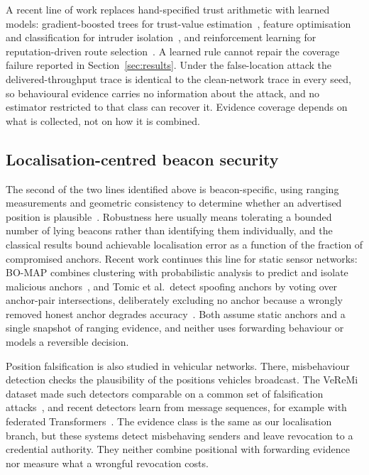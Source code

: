 A recent line of work replaces hand-specified trust arithmetic with learned
models: gradient-boosted trees for trust-value estimation~\cite{dhand2025secure},
feature optimisation and classification for intruder
isolation~\cite{kavitha2019india}, and reinforcement learning for
reputation-driven route selection~\cite{ryu2023reputation}. A learned rule
cannot repair the coverage failure reported in Section~\ref{sec:results}.
Under the false-location attack the delivered-throughput trace is identical to
the clean-network trace in every seed, so behavioural evidence carries no
information about the attack, and no estimator restricted to that class can
recover it. Evidence coverage depends on what is collected, not on how it is
combined.

\subsection{Localisation-centred beacon security}

The second of the two lines identified above is beacon-specific, using ranging measurements and geometric
consistency to determine whether an advertised position is
plausible~\cite{kuriakose2023embn,liu2008attack}. Robustness here usually
means tolerating a bounded number of lying beacons rather than identifying
them individually, and the classical results bound achievable localisation
error as a function of the fraction of compromised anchors. Recent work
continues this line for static sensor networks: BO-MAP combines clustering
with probabilistic analysis to predict and isolate malicious
anchors~\cite{sreeja2024bomap}, and Tomic et al.\ detect spoofing anchors by
voting over anchor-pair intersections, deliberately excluding no anchor
because a wrongly removed honest anchor degrades
accuracy~\cite{tomic2026voting}. Both assume static anchors and a single
snapshot of ranging evidence, and neither uses forwarding behaviour or models
a reversible decision.

Position falsification is also studied in vehicular networks. There,
misbehaviour detection checks the plausibility of the positions vehicles
broadcast. The VeReMi dataset made such detectors comparable on a common set
of falsification attacks~\cite{vanderheijden2018veremi}, and recent detectors
learn from message sequences, for example with federated
Transformers~\cite{khan2026mofed}. The evidence class is the same as our
localisation branch, but these systems detect misbehaving senders and leave
revocation to a credential authority. They neither combine positional with
forwarding evidence nor measure what a wrongful revocation costs.

